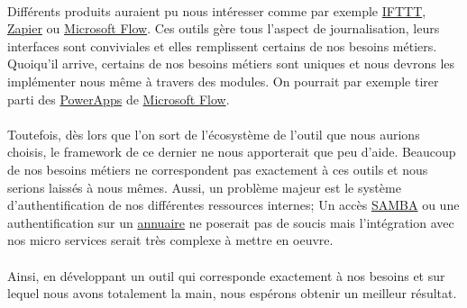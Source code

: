 \paragraph{}
Différents produits auraient pu nous intéresser comme par exemple
\href{https://ifttt.com/}{IFTTT},
\href{https://zapier.com/}{Zapier} ou
\href{https://flow.microsoft.com/fr-fr/}{Microsoft Flow}.
Ces outils gère tous l'aspect de journalisation, leurs interfaces sont conviviales et elles remplissent certains de nos besoins métiers.
Quoiqu'il arrive, certains de nos besoins métiers sont uniques et nous devrons les implémenter nous même à travers des modules.
On pourrait par exemple tirer parti des \href{https://powerapps.microsoft.com/fr-fr/}{PowerApps} de \href{https://flow.microsoft.com/fr-fr/}{Microsoft Flow}.

\paragraph{}
Toutefois, dès lors que l'on sort de l'écosystème de l'outil que nous aurions choisis, le framework de ce dernier ne nous apporterait que peu d'aide.
Beaucoup de nos besoins métiers ne correspondent pas exactement à ces outils et nous serions laissés à nous mêmes.
Aussi, un problème majeur est le système d'authentification de nos différentes ressources internes;
Un accès \href{https://fr.wikipedia.org/wiki/Samba_(informatique)}{SAMBA} ou
une authentification sur un \href{https://fr.wikipedia.org/wiki/Annuaire}{annuaire} ne poserait pas de soucis
mais l'intégration avec nos micro services serait très complexe à mettre en oeuvre.

\paragraph{}
Ainsi, en développant un outil qui corresponde exactement à nos besoins et sur lequel nous avons totalement la main, nous espérons obtenir un meilleur résultat.
